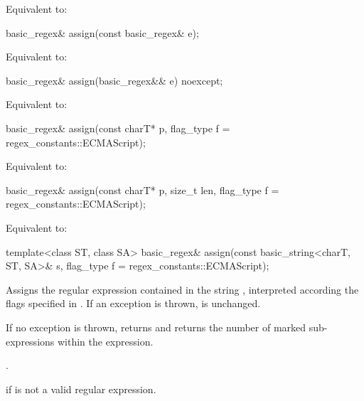 \begin{itemdescr}
\pnum
\effects
Equivalent to: 
\end{itemdescr}

%
\begin{itemdecl}
basic_regex& assign(const basic_regex& e);
\end{itemdecl}

\begin{itemdescr}
\pnum
\effects
Equivalent to: 
\end{itemdescr}

%
\begin{itemdecl}
basic_regex& assign(basic_regex&& e) noexcept;
\end{itemdecl}

\begin{itemdescr}
\pnum
\effects
Equivalent to: 
\end{itemdescr}

%
\begin{itemdecl}
basic_regex& assign(const charT* p, flag_type f = regex_constants::ECMAScript);
\end{itemdecl}

\begin{itemdescr}
\pnum
\effects
Equivalent to: 
\end{itemdescr}

%
\begin{itemdecl}
basic_regex& assign(const charT* p, size_t len, flag_type f = regex_constants::ECMAScript);
\end{itemdecl}

\begin{itemdescr}
\pnum
\effects
Equivalent to: 
\end{itemdescr}

%
\begin{itemdecl}
template<class ST, class SA>
  basic_regex& assign(const basic_string<charT, ST, SA>& s,
                      flag_type f = regex_constants::ECMAScript);
\end{itemdecl}

\begin{itemdescr}
\pnum
\effects
Assigns the regular expression contained in the string
, interpreted according the flags specified in .
If an exception is thrown,  is unchanged.

\pnum
\ensures
If no exception is thrown,
 returns  and 
returns the number of marked sub-expressions within the expression.

\pnum
\returns
{}.

\pnum
\throws
{} if  is not a valid regular expression.
\end{itemdescr}

